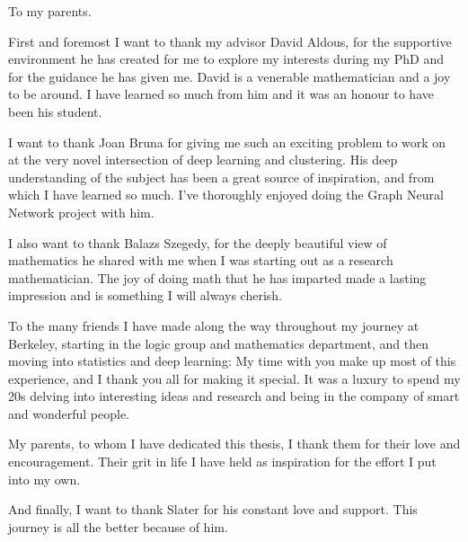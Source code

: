\documentclass{ucbthesis}
\theoremstyle{definition}
\theoremstyle{remark}
\begin{document}
\begin{frontmatter}

\begin{dedication}
\null\vfil
\begin{center}
To my parents. \\\vspace{12pt}

\end{center}
\vfil\null
\end{dedication}

\tableofcontents
\clearpage
\listoffigures
\clearpage


\begin{acknowledgements}
First and foremost I want to thank my advisor David Aldous, for the supportive environment he has created for me to explore my interests during my PhD and for the guidance he has given me. David is a venerable mathematician and a joy to be around. I have learned so much from him and it was an honour to have been his student.

I want to thank Joan Bruna for giving me such an exciting problem to work on at the very novel intersection of deep learning and clustering. His deep understanding of the subject has been a great source of inspiration, and from which I have learned so much.  I've thoroughly enjoyed doing the Graph Neural Network project with him.

I also want to thank Balazs Szegedy, for the deeply beautiful view of mathematics he shared with me when I was starting out as a research mathematician. The joy of doing math that he has imparted made a lasting impression and is something I will always cherish. 

To the many friends I have made along the way throughout my journey at Berkeley, starting in the logic group and mathematics department, and then moving into statistics and deep learning:  My time with you make up most of this experience, and I thank you all for making it special.  It was a luxury to spend my 20s delving into interesting ideas and research and being in the company of smart and wonderful people.

My parents, to whom I have dedicated this thesis, I thank them for their love and encouragement. Their grit in life I have held as inspiration for the effort I put into my own.

And finally, I want to thank Slater for his constant love and support. This journey is all the better because of him.  

\end{acknowledgements}

\end{frontmatter}
\end{document}

